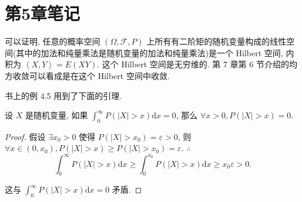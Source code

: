 \documentclass[color=black,device=normal,lang=cn]{elegantnote}
\numberwithin{equation}{section}
\theoremstyle{plain}
\numberwithin{exercise}{exsection}
\begin{document}
\section{第5章笔记}
可以证明, 任意的概率空间 $(\Omega,\mathcal{F},P)$ 上所有有二阶矩的随机变量构成的线性空间(其中的加法和纯量乘法是随机变量的加法和纯量乘法)是一个 Hilbert 空间, 内积为 $\left<X,Y\right>=E(XY)$. 这个 Hilbert 空间是无穷维的. 第 7 章第 6 节介绍的均方收敛可以看成是在这个 Hilbert 空间中收敛.

书上的例 4.5 用到了下面的引理.
\begin{lemma}
    设 $X$ 是随机变量, 如果 $\int_0^\infty P(|X|>x)\mathrm{d}x=0$, 那么 $\forall x>0,P(|X|>x)=0$.
\end{lemma}
\begin{proof}
    假设 $\exists x_0>0$ 使得 $P(|X|>x_0)=\varepsilon>0$, 则 $\forall x\in(0,x_0),P(|X|>x)\geq P(|X|>x_0)=\varepsilon$. $\therefore$
    \[\int_0^\infty P(|X|>x)\mathrm{d}x\geq\int_0^{x_0}P(|X|>x)\mathrm{d}x\geq x_0\varepsilon>0.\]

    这与 $\int_0^\infty P(|X|>x)\mathrm{d}x=0$ 矛盾.
\end{proof}
\end{document}
